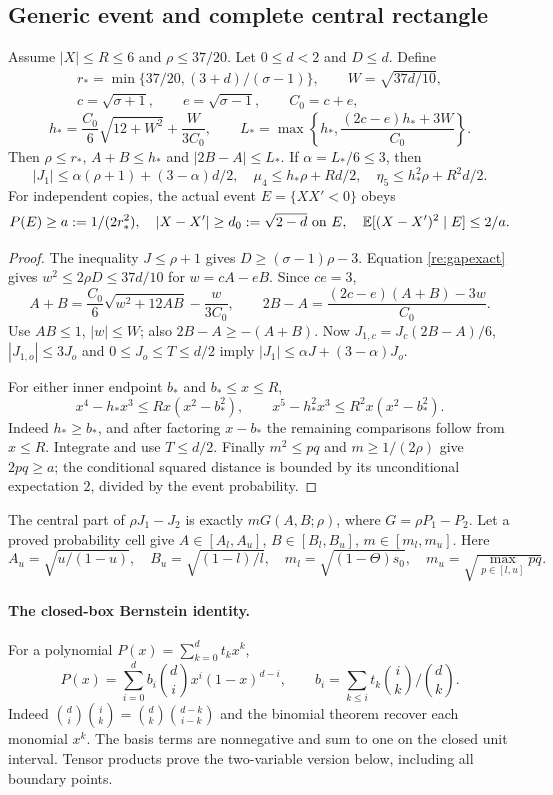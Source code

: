 \subsection{Generic event and complete central rectangle}
\begin{lemma}\label{entry201:event}\label{mom:third}
Assume $|X|\le R\le6$ and $\rho\le37/20$. Let $0\le d<2$ and $D\le d$. Define
\[
 \begin{gathered}
 r_*=\min\{37/20,(3+d)/(\sigma-1)\},\qquad
 W=\sqrt{37d/10},\\
 c=\sqrt{\sigma+1},\qquad e=\sqrt{\sigma-1},\qquad C_0=c+e,
 \end{gathered}
\]
\[
 h_*=\frac{C_0}{6}\sqrt{12+W^2}+\frac{W}{3C_0},\qquad
 L_*=\max\left\{h_*,\frac{(2c-e)h_*+3W}{C_0}\right\}.
\]
Then $\rho\le r_*$, $A+B\le h_*$ and $|2B-A|\le L_*$.
If $\alpha=L_*/6\le3$, then
\[
 |J_1|\le\alpha(\rho+1)+(3-\alpha)d/2,\quad
 \mu_4\le h_*\rho+Rd/2,\quad
 \eta_5\le h_*^2\rho+R^2d/2.
\]
For independent copies, the actual event $E=\{XX'<0\}$ obeys
\[
 P(E)\ge a:=1/(2r_*^2),\quad
 |X-X'|\ge d_0:=\sqrt{2-d}\text{ on }E,\quad
 \mathbb E[(X-X')^2\mid E]\le2/a.
\]
\end{lemma}
\begin{proof}
The inequality $J\le\rho+1$ gives $D\ge(\sigma-1)\rho-3$.
Equation \eqref{re:gapexact} gives $w^2\le2\rho D\le37d/10$ for
$w=cA-eB$. Since $ce=3$,
\[
 A+B=\frac{C_0}{6}\sqrt{w^2+12AB}-\frac{w}{3C_0},
 \qquad 2B-A=\frac{(2c-e)(A+B)-3w}{C_0}.
\]
Use $AB\le1$, $|w|\le W$; also $2B-A\ge-(A+B)$.
Now $J_{1,c}=J_c(2B-A)/6$, $|J_{1,o}|\le3J_o$ and
$0\le J_o\le T\le d/2$ imply
$|J_1|\le\alpha J+(3-\alpha)J_o$.

For either inner endpoint $b_*$ and $b_*\le x\le R$,
\[
 x^4-h_*x^3\le R x(x^2-b_*^2),\qquad
 x^5-h_*^2x^3\le R^2x(x^2-b_*^2).
\]
Indeed $h_*\ge b_*$, and after factoring $x-b_*$ the remaining
comparisons follow from $x\le R$. Integrate and use $T\le d/2$.
Finally $m^2\le pq$ and $m\ge1/(2\rho)$ give $2pq\ge a$;
the conditional squared distance is bounded by its unconditional
expectation $2$, divided by the event probability.
\end{proof}

The central part of $\rho J_1-J_2$ is exactly
$mG(A,B;\rho)$, where $G=\rho P_1-P_2$.
Let a proved probability cell give
$A\in[A_l,A_u]$, $B\in[B_l,B_u]$, $m\in[m_l,m_u]$.
Here
\[
 A_u=\sqrt{u/(1-u)},\quad B_u=\sqrt{(1-l)/l},\quad
 m_l=\sqrt{(1-\Theta)s_0},\quad
 m_u=\sqrt{\max_{p\in[l,u]}pq}.
\]

\paragraph{The closed-box Bernstein identity.}\label{re:bernstein}
For a polynomial $P(x)=\sum_{k=0}^dt_kx^k$,
\[
 P(x)=\sum_{i=0}^d b_i\binom di x^i(1-x)^{d-i},\qquad
 b_i=\sum_{k\le i}t_k\binom ik/\binom dk.
\]
Indeed $\binom di\binom ik=\binom dk\binom{d-k}{i-k}$ and the
binomial theorem recover each monomial $x^k$. The basis terms are
nonnegative and sum to one on the closed unit interval. Tensor products
prove the two-variable version below, including all boundary points.

